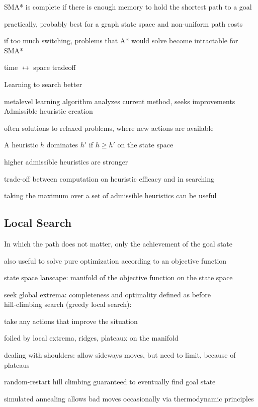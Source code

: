 \documentclass[12pt]{article}
\begin{document}
SMA* is complete if there is enough memory to hold the shortest path to a goal

practically, probably best for a graph state space and non-uniform path costs

if too much switching, problems that A* would solve become intractable for SMA*

time $\leftrightarrow$ space tradeoff

\noindent
Learning to search better

metalevel learning algorithm analyzes current method, seeks improvements\\

\noindent
Admissible heuristic creation

often solutions to relaxed problems, where new actions are available

\noindent
A heuristic $h$ dominates $h'$ if $h \geq h'$ on the state space

higher admissible heuristics are stronger

trade-off between computation on heuristic efficacy and in searching

taking the maximum over a set of admissible heuristics can be useful

\subsection{Local Search}

\noindent
In which the path does not matter, only the achievement of the goal state

also useful to solve pure optimization according to an objective function

\noindent
state space lanscape: manifold of the objective function on the state space

seek global extrema: completeness and optimality defined as before\\

\noindent
hill-climbing search (greedy local search):

take any actions that improve the situation

foiled by local extrema, ridges, plateaux on the manifold

dealing with shoulders: allow sideways moves, but need to limit, because of plateaus

random-restart hill climbing guaranteed to eventually find goal state

\noindent
simulated annealing allows bad moves occasionally via thermodynamic principles
\end{document}

